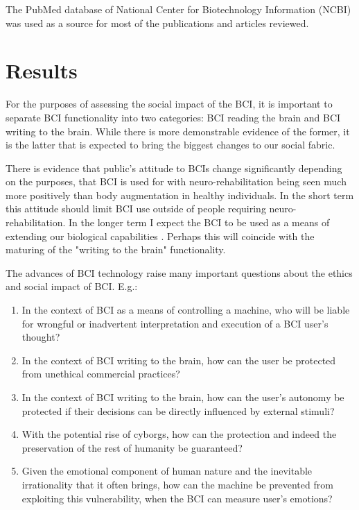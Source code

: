 \documentclass[fleqn,11pt]{olplainarticle}
\begin{document}
The PubMed database of  National Center for Biotechnology Information (NCBI) was used as a source for most of the publications and articles reviewed.

\section{Results}
For the purposes of assessing the social impact of the BCI, it is important to separate BCI functionality into two categories: BCI reading the brain and BCI writing to the brain. While there is more demonstrable evidence of the former, it is the latter that is expected to bring the biggest changes to our social fabric. 

There is evidence that public's attitude to BCIs change significantly depending on the purposes, that BCI is used for \cite{meyer2018disabled} with neuro-rehabilitation being seen much more positively than body augmentation in healthy individuals. In the short term this attitude should limit BCI use outside of people requiring neuro-rehabilitation. In the longer term I expect the BCI to be used as a means of extending our biological capabilities \cite{warwick2003cyborg}. Perhaps this will coincide with the maturing of the "writing to the brain" functionality.

The advances of BCI technology raise many important questions about the ethics and social impact of BCI. E.g.:
\begin{enumerate}
    \item In the context of BCI as a means of controlling a machine, who will be liable for wrongful or inadvertent interpretation and execution of a BCI user's thought?
    \item In the context of BCI writing to the brain, how can the user be protected from unethical commercial practices?
    \item In the context of BCI writing to the brain, how can the user's autonomy be protected if their decisions can be directly influenced by external stimuli?
    \item With the potential rise of cyborgs, how can the protection and indeed the preservation of the rest of humanity be guaranteed?
    \item Given the emotional component of human nature and the inevitable irrationality that it often brings, how can the machine be prevented from exploiting this vulnerability, when the BCI can measure user's emotions? 
\end{enumerate}
\end{document}
